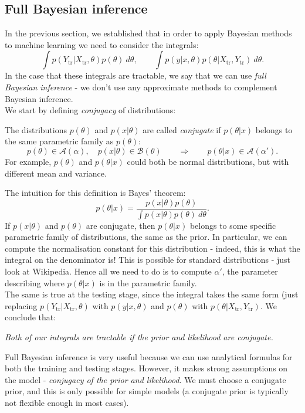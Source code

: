 \subsection{Full Bayesian inference}
In the previous section, we established that in order to apply Bayesian methods to machine learning we need to consider the integrals:
\begin{equation*}
\int p(Y_{\text{tr}} | X_{\text{tr}}, \theta) p(\theta)\ d\theta, \qquad \int p(y | x, \theta) p(\theta | X_{\text{tr}}, Y_{\text{tr}}) \ d\theta.
\end{equation*}
In the case that these integrals are tractable, we say that we can use \textit{full Bayesian inference} - we don't use any approximate methods to complement Bayesian inference.\\

We start by defining \textit{conjugacy} of distributions:
\begin{framedef}
The distributions $p(\theta)$ and $p(x|\theta)$ are called \textit{conjugate} if $p(\theta | x)$ belongs to the same parametric family as $p(\theta)$:
\begin{equation*}
p(\theta) \in \mathcal{A}(\alpha), \quad p(x|\theta) \in \mathcal{B}(\theta) \qquad \Rightarrow \qquad p(\theta | x) \in \mathcal{A}(\alpha').
\end{equation*}
For example, $p(\theta)$ and $p(\theta | x)$ could both be normal distributions, but with different mean and variance.
\end{framedef}

The intuition for this definition is Bayes' theorem:
\begin{equation*}
p(\theta | x) = \frac{p(x | \theta) p(\theta)}{\int p(x | \theta)p(\theta)\ d\theta}.
\end{equation*}
If $p(x | \theta)$ and $p(\theta)$ are conjugate, then $p(\theta | x)$ belongs to some specific parametric family of distributions, the same as the prior. In particular, we can compute the normalisation constant for this distribution - indeed, this is what the integral on the denominator is! This is possible for standard distributions - just look at Wikipedia. Hence all we need to do is to compute $\alpha'$, the parameter describing where $p(\theta | x)$ is in the parametric family.\\

The same is true at the testing stage, since the integral takes the same form (just replacing $p(Y_{\text{tr}} | X_{\text{tr}}, \theta)$ with $p(y| x,\theta)$ and $p(\theta)$ with $p(\theta | X_{\text{tr}}, Y_{\text{tr}})$. We conclude that:
\begin{center}
\textit{Both of our integrals are tractable if the prior and likelihood are conjugate.}
\end{center}
Full Bayesian inference is very useful because we can use analytical formulas for both the training and testing stages. However, it makes strong assumptions on the model - \textit{conjugacy of the prior and likelihood}. We must choose a conjugate prior, and this is only possible for simple models (a conjugate prior is typically not flexible enough in most cases).

